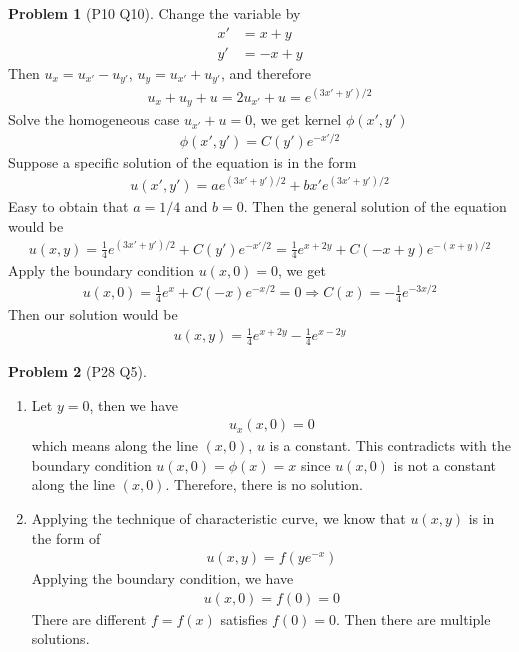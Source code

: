 \documentclass[twoside,11pt]{article}
\theoremstyle{definition}
\newtheorem{problem}{Problem}
\theoremstyle{remark}
\begin{document}
\begin{problem}[P10 Q10]
Change the variable by
\begin{align*}
    x' &= x + y\\
    y' &= -x + y
\end{align*}
Then $u_x=u_{x'}-u_{y'}$, $u_y=u_{x'}+u_{y'}$, and therefore
\begin{align*}
    u_x + u_y + u= 2u_{x'} + u = e^{(3x'+y')/2}
\end{align*}
Solve the homogeneous case $u_{x'}+u=0$, we get kernel $\phi(x',y')$
\begin{align*}
    \phi(x',y')=C(y')e^{-x'/2}
\end{align*}
Suppose a specific solution of the equation is in the form 
\begin{align*}
    u(x',y') = ae^{(3x'+y')/2} + bx'e^{(3x'+y')/2}
\end{align*}
Easy to obtain that $a=1/4$ and $b=0$.
Then the general solution of the equation would be
\begin{align*}
    u(x,y) = \frac{1}{4}e^{(3x'+y')/2} + C(y')e^{-x'/2}
    =\frac{1}{4}e^{x+2y} + C(-x+y)e^{-(x+y)/2}
\end{align*}
Apply the boundary condition $u(x,0)=0$, we get
\begin{align*}
    u(x,0) = \frac{1}{4}e^{x} + C(-x)e^{-x/2} = 0\Rightarrow
    C(x)=-\frac{1}{4}e^{-3x/2}
\end{align*}
Then our solution would be
\begin{align*}
    u(x,y) = \frac{1}{4}e^{x+2y} - \frac{1}{4}e^{x-2y}
\end{align*}
\end{problem}

\begin{problem}[P28 Q5]\
    \begin{enumerate}[label=(\alph*)]
        \item Let $y=0$, then we have
        \begin{align*}
            u_{x}(x, 0) = 0
        \end{align*}
        which means along the line $(x, 0)$, $u$ is a constant.
        This contradicts with the boundary condition $u(x,0)=\phi(x)=x$ since
        $u(x, 0)$ is not a constant along the line $(x, 0)$.
        Therefore, there is no solution.

        \item Applying the technique of characteristic curve, we know that
        $u(x,y)$ is in the form of
        \begin{align*}
            u(x, y) = f(ye^{-x})
        \end{align*}
        Applying the boundary condition, we have
        \begin{align*}
            u(x,0) = f(0) = 0
        \end{align*}
        There are different $f=f(x)$ satisfies $f(0)=0$.
        Then there are multiple solutions.
    \end{enumerate}
\end{problem}
\end{document}
